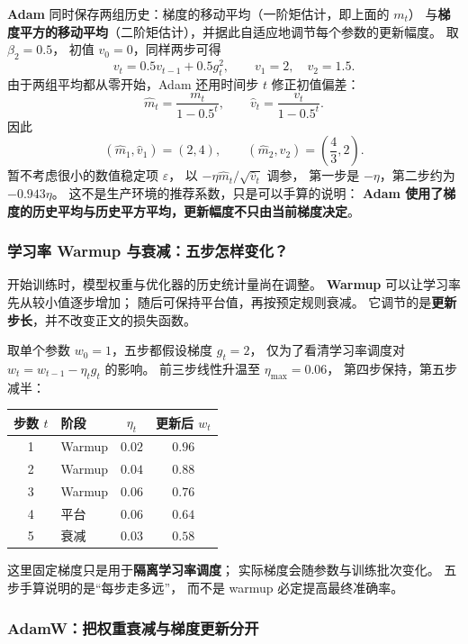 \textbf{Adam} 同时保存两组历史：梯度的移动平均（一阶矩估计，即上面的 $m_t$）
与\textbf{梯度平方的移动平均}（二阶矩估计），并据此自适应地调节每个参数的更新幅度。
取 $\beta_2=0.5$，
初值 $v_0=0$，同样两步可得
\[
v_t=0.5v_{t-1}+0.5g_t^2,\qquad
v_1=2,\quad v_2=1.5.
\]
由于两组平均都从零开始，Adam 还用时间步 $t$ 修正初值偏差：
\[
\widehat{m}_t=\frac{m_t}{1-0.5^t},\qquad
\widehat{v}_t=\frac{v_t}{1-0.5^t}.
\]
因此
\[
(\widehat{m}_1,\widehat{v}_1)=(2,4),\qquad
(\widehat{m}_2,\widehat{v}_2)=\left(\frac43,2\right).
\]
暂不考虑很小的数值稳定项 $\varepsilon$，
以 $-\eta\widehat{m}_t/\sqrt{\widehat{v}_t}$ 调参，
第一步是 $-\eta$，第二步约为 $-0.943\eta$。
这不是生产环境的推荐系数，只是可以手算的说明：
\textbf{Adam 使用了梯度的历史平均与历史平方平均，更新幅度不只由当前梯度决定}。

\subsubsection{学习率 Warmup 与衰减：五步怎样变化？}
\label{concept:lr-warmup}

开始训练时，模型权重与优化器的历史统计量尚在调整。
\textbf{Warmup} 可以让学习率先从较小值逐步增加；
随后可保持平台值，再按预定规则衰减。
它调节的是\textbf{更新步长}，并不改变正文的损失函数。

取单个参数 $w_0=1$，五步都假设梯度 $g_t=2$，
仅为了看清学习率调度对 $w_t=w_{t-1}-\eta_t g_t$ 的影响。
前三步线性升温至 $\eta_{\max}=0.06$，
第四步保持，第五步减半：
\begin{center}\small
{}
\begin{tabularx}{\linewidth}{@{}cXcc@{}}
\toprule
步数 $t$ & 阶段 & $\eta_t$ & 更新后 $w_t$\\\midrule
1 & Warmup & $0.02$ & $0.96$\\
2 & Warmup & $0.04$ & $0.88$\\
3 & Warmup & $0.06$ & $0.76$\\
4 & 平台 & $0.06$ & $0.64$\\
5 & 衰减 & $0.03$ & $\boxed{0.58}$\\
\bottomrule
\end{tabularx}
\end{center}
这里固定梯度只是用于\textbf{隔离学习率调度}；
实际梯度会随参数与训练批次变化。
五步手算说明的是“每步走多远”，
而不是 warmup 必定提高最终准确率。

\subsubsection{AdamW：把权重衰减与梯度更新分开}
\label{concept:adamw}

